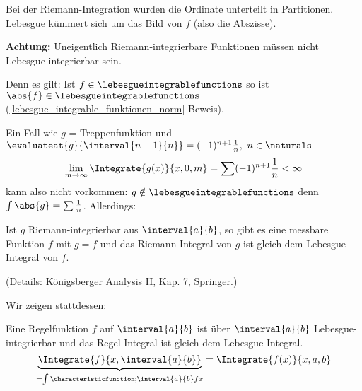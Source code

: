 \begin{erinnerung*}
  Bei der Riemann-Integration wurden die Ordinate unterteilt in Partitionen. Lebesgue kümmert sich um das Bild von \(f\) (also die Abszisse).
\end{erinnerung*}

\textbf{Achtung:} Uneigentlich Riemann-integrierbare Funktionen müssen nicht Lebesgue-integrierbar sein.

Denn es gilt: Ist \(f\in \lebesgueintegrablefunctions\) so ist \(\abs{f}\in \lebesgueintegrablefunctions\) (\ref{lebesgue_integrable_funktionen_norm} Beweis).

Ein Fall wie \(g\) = Treppenfunktion und \(\evaluateat{g}{\interval{n-1}{n}}=(-1)^{n+1}\frac{1}{n},\ n\in\naturals\)
\begin{equation*}
    \lim_{m\to\infty}\Integrate{g(x)}{x,0,m}=\sum(-1)^{n+1}\frac{1}{n}< \infty 
\end{equation*}
kann also nicht vorkommen: \(g\notin \lebesgueintegrablefunctions\) denn \(\int\abs{g}=\sum\frac{1}{n}\). Allerdings:

\begin{satz}
    \label{riemann_integrierbar_messbar}
    Ist \(g\) Riemann-integrierbar aus \(\interval{a}{b}\), so gibt es eine messbare Funktion \(f\) mit \(g=f\) \fue und das Riemann-Integral von \(g\) ist gleich dem Lebesgue-Integral von \(f\).
\end{satz}

(Details: Königsberger Analysis II, Kap. 7, Springer.)

Wir zeigen stattdessen:

\begin{satz}
    \label{theoRegelFkt} %
    Eine Regelfunktion \(f\) auf \(\interval{a}{b}\) ist über \(\interval{a}{b}\) Lebesgue-integrierbar und das Regel-Integral ist gleich dem Lebesgue-Integral.
    \begin{equation*}
        \underbrace{\Integrate{f}{x,\interval{a}{b}}}_{=\int{\characteristicfunction;{\interval{a}{b}}f{x}}}=\Integrate{f(x)}{x,a,b}
    \end{equation*}
\end{satz}

